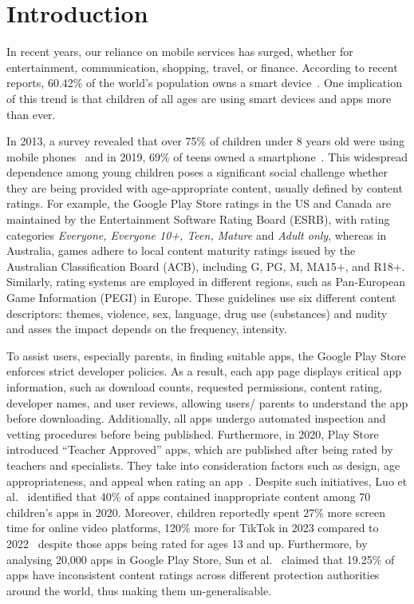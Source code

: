 \section{Introduction}
\label{Sec:introduction_2}

In recent years, our reliance on mobile services has surged, whether for entertainment, communication, shopping, travel, or finance. According to recent reports, 60.42\% of the world's population owns a smart device~\cite{ashtuener2024}. One implication of this trend is that children of all ages are using smart devices and apps more than ever.


In 2013, a survey revealed that over 75\% of children under 8 years old were using mobile phones~\cite{liu2016identifying} and in 2019, 69\% of teens owned a smartphone~\cite{2019smartphone}. This widespread dependence among young children poses a significant social challenge whether they are being provided with age-appropriate content, usually defined by content ratings. For example, the Google Play Store ratings in the US and Canada are maintained by the Entertainment Software Rating Board (ESRB), with rating categories \emph{Everyone, Everyone 10+, Teen, Mature} and \emph{Adult only}, whereas in Australia, games adhere to local content maturity ratings issued by the Australian Classification Board (ACB), including G, PG, M, MA15+, and R18+. 
Similarly, rating systems are employed in different regions, such as Pan-European Game Information (PEGI) in Europe. These guidelines use six different content descriptors: themes, violence, sex, language, drug use (substances) and nudity and asses the impact depends on the frequency, intensity.

To assist users, especially parents, in finding suitable apps, the Google Play Store enforces strict developer policies. As a result, each app page displays critical app information, such as download counts, requested permissions, content rating, developer names, and user reviews, allowing users/ parents to understand the app before downloading.
Additionally,  all apps undergo automated inspection and vetting procedures before being published. Furthermore, in 2020, Play Store introduced ``Teacher Approved'' apps, which are published after being rated by teachers and specialists. They take into consideration factors such as design, age appropriateness, and appeal when rating an app~\cite{teacherAApps}. Despite such initiatives, Luo et al.~\cite{luo2020automatic} identified that 40\% of apps contained inappropriate content among 70 children's apps in 2020. Moreover, children reportedly spent 27\% more screen time for online video platforms, 120\% more for TikTok in 2023 compared to 2022~\cite{anualdatareport2023} despite those apps being rated for ages 13 and up. Furthermore, by analysing 20,000 apps in Google Play Store, Sun et al.~\cite{sun2023not} claimed that 19.25\% of apps have inconsistent content ratings across different protection authorities around the world, thus making them un-generalisable.

